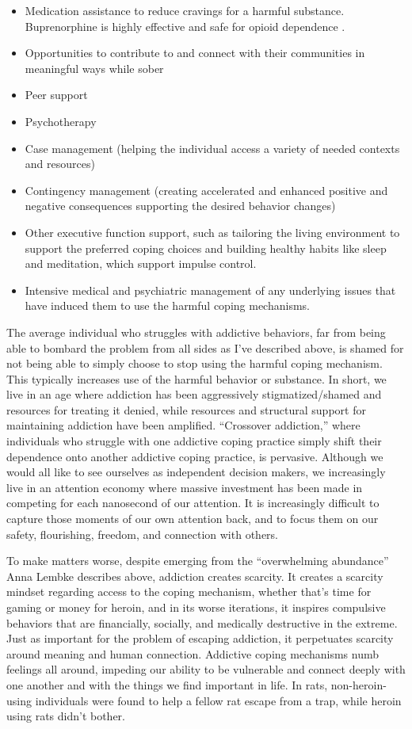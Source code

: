 \documentclass[12pt,letterpaper]{book}
\begin{document}
\begin{itemize}
    \item Medication assistance to reduce cravings for a harmful substance. Buprenorphine is highly effective and safe for opioid dependence \cite{Mattickbuprenorphine}.
    \item Opportunities to contribute to and connect with their communities in meaningful ways while sober
    \item Peer support
    \item Psychotherapy
    \item Case management (helping the individual access a variety of needed contexts and resources)
    \item Contingency management (creating accelerated and enhanced positive and negative consequences supporting the desired behavior changes)
    \item Other executive function support, such as tailoring the living environment to support the preferred coping choices and building healthy habits like sleep and meditation, which support impulse control.
    \item Intensive medical and psychiatric management of any underlying issues that have induced them to use the harmful coping mechanisms.
\end{itemize}

The average individual who struggles with addictive behaviors, far from being able to bombard the problem from all sides as I've described above, is shamed for not being able to simply choose to stop using the harmful coping mechanism. This typically increases use of the harmful behavior or substance. In short, we live in an age where addiction has been aggressively stigmatized/shamed and resources for treating it denied, while resources and structural support for maintaining addiction have been amplified. “Crossover addiction,” where individuals who struggle with one addictive coping practice simply shift their dependence onto another addictive coping practice, is pervasive. Although we would all like to see ourselves as independent decision makers, we increasingly live in an attention economy where massive investment has been made in competing for each nanosecond of our attention. It is increasingly difficult to capture those moments of our own attention back, and to focus them on our safety, flourishing, freedom, and connection with others.

To make matters worse, despite emerging from the “overwhelming abundance” Anna Lembke describes above, addiction creates scarcity. It creates a scarcity mindset regarding access to the coping mechanism, whether that's time for gaming or money for heroin, and in its worse iterations, it inspires compulsive behaviors that are financially, socially, and medically destructive in the extreme. Just as important for the problem of escaping addiction, it perpetuates scarcity around meaning and human connection. Addictive coping mechanisms numb feelings all around, impeding our ability to be vulnerable and connect deeply with one another and with the things we find important in life. In rats, non-heroin-using individuals were found to help a fellow rat escape from a trap, while heroin using rats didn't bother.
\end{document}
